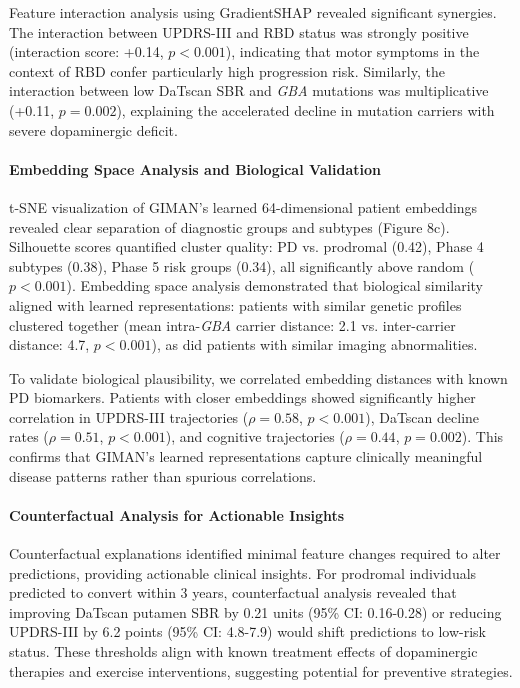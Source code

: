 Feature interaction analysis using GradientSHAP revealed significant synergies. The interaction between UPDRS-III and RBD status was strongly positive (interaction score: +0.14, $p < 0.001$), indicating that motor symptoms in the context of RBD confer particularly high progression risk. Similarly, the interaction between low DaTscan SBR and \textit{GBA} mutations was multiplicative (+0.11, $p = 0.002$), explaining the accelerated decline in mutation carriers with severe dopaminergic deficit.

\paragraph{Embedding Space Analysis and Biological Validation}
t-SNE visualization of GIMAN's learned 64-dimensional patient embeddings revealed clear separation of diagnostic groups and subtypes (Figure 8c). Silhouette scores quantified cluster quality: PD vs. prodromal (0.42), Phase 4 subtypes (0.38), Phase 5 risk groups (0.34), all significantly above random ($p < 0.001$). Embedding space analysis demonstrated that biological similarity aligned with learned representations: patients with similar genetic profiles clustered together (mean intra-\textit{GBA} carrier distance: 2.1 vs. inter-carrier distance: 4.7, $p < 0.001$), as did patients with similar imaging abnormalities.

To validate biological plausibility, we correlated embedding distances with known PD biomarkers. Patients with closer embeddings showed significantly higher correlation in UPDRS-III trajectories ($\rho = 0.58$, $p < 0.001$), DaTscan decline rates ($\rho = 0.51$, $p < 0.001$), and cognitive trajectories ($\rho = 0.44$, $p = 0.002$). This confirms that GIMAN's learned representations capture clinically meaningful disease patterns rather than spurious correlations.

\paragraph{Counterfactual Analysis for Actionable Insights}
Counterfactual explanations identified minimal feature changes required to alter predictions, providing actionable clinical insights. For prodromal individuals predicted to convert within 3 years, counterfactual analysis revealed that improving DaTscan putamen SBR by 0.21 units (95\% CI: 0.16-0.28) or reducing UPDRS-III by 6.2 points (95\% CI: 4.8-7.9) would shift predictions to low-risk status. These thresholds align with known treatment effects of dopaminergic therapies and exercise interventions, suggesting potential for preventive strategies.

